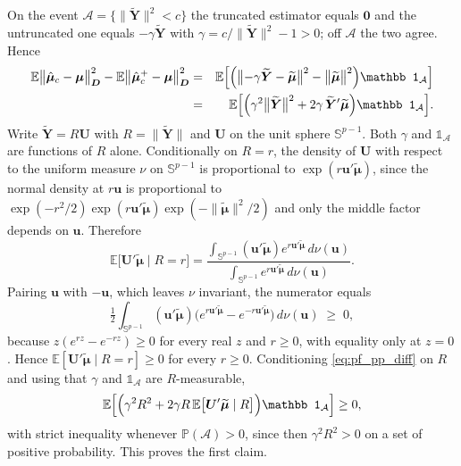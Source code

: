 \documentclass[pdflatex,sn-mathphys-num]{sn-jnl}%
\theoremstyle{thmstyleone}%
\theoremstyle{thmstyletwo}%
\theoremstyle{thmstylethree}%
\newcommand{\E}{\mathbb{E}}
\begin{document}
\begin{appendices}
On the event $\mathcal A=\{\|\widetilde{\bm Y}\|^2<c\}$ the truncated estimator equals $\bm 0$ and the untruncated one equals $-\gamma\widetilde{\bm Y}$ with $\gamma=c/\|\widetilde{\bm Y}\|^2-1>0$; off $\mathcal A$ the two agree. Hence
\begin{eqnarray}
\label{eq:pf_pp_diff}
\E\bigl\|\hat{\bm\mu}_c-\bm\mu\bigr\|^2_{\bm D}
-\E\bigl\|\hat{\bm\mu}^{+}_c-\bm\mu\bigr\|^2_{\bm D}
&=&
\E\Bigl[\Bigl(\bigl\|-\gamma\widetilde{\bm Y}-\widetilde{\bm\mu}\bigr\|^2-\bigl\|\widetilde{\bm\mu}\bigr\|^2\Bigr)\mathbb 1_{\mathcal A}\Bigr]
\cr
&=&
\E\Bigl[\Bigl(\gamma^{2}\bigl\|\widetilde{\bm Y}\bigr\|^{2}+2\gamma\,\widetilde{\bm Y}'\widetilde{\bm\mu}\Bigr)\mathbb 1_{\mathcal A}\Bigr].
\end{eqnarray}
Write $\widetilde{\bm Y}=R\bm U$ with $R=\|\widetilde{\bm Y}\|$ and $\bm U$ on the unit sphere $\mathbb S^{p-1}$. Both $\gamma$ and $\mathbb 1_{\mathcal A}$ are functions of $R$ alone. Conditionally on $R=r$, the density of $\bm U$ with respect to the uniform measure $\nu$ on $\mathbb S^{p-1}$ is proportional to $\exp(r\bm u'\widetilde{\bm\mu})$, since the normal density at $r\bm u$ is proportional to $\exp(-r^2/2)\exp(r\bm u'\widetilde{\bm\mu})\exp(-\|\widetilde{\bm\mu}\|^2/2)$ and only the middle factor depends on $\bm u$. Therefore
\begin{equation}
\E\bigl[\bm U'\widetilde{\bm\mu}\mid R=r\bigr]
=
\frac{\int_{\mathbb S^{p-1}}(\bm u'\widetilde{\bm\mu})e^{r\bm u'\widetilde{\bm\mu}}\,d\nu(\bm u)}
     {\int_{\mathbb S^{p-1}}e^{r\bm u'\widetilde{\bm\mu}}\,d\nu(\bm u)} .
\end{equation}
Pairing $\bm u$ with $-\bm u$, which leaves $\nu$ invariant, the numerator equals
\begin{equation}
\tfrac12\int_{\mathbb S^{p-1}}(\bm u'\widetilde{\bm\mu})\bigl(e^{r\bm u'\widetilde{\bm\mu}}-e^{-r\bm u'\widetilde{\bm\mu}}\bigr)\,d\nu(\bm u)
\;\ge\;0,
\end{equation}
because $z(e^{rz}-e^{-rz})\ge0$ for every real $z$ and $r\ge0$, with equality only at $z=0$. Hence $\E[\bm U'\widetilde{\bm\mu}\mid R=r]\ge0$ for every $r\ge0$. Conditioning \eqref{eq:pf_pp_diff} on $R$ and using that $\gamma$ and $\mathbb 1_{\mathcal A}$ are $R$-measurable,
\begin{equation}
\E\Bigl[\Bigl(\gamma^{2}R^{2}+2\gamma R\,\E\bigl[\bm U'\widetilde{\bm\mu}\mid R\bigr]\Bigr)\mathbb 1_{\mathcal A}\Bigr]\ge0 ,
\end{equation}
with strict inequality whenever $\mathbb P(\mathcal A)>0$, since then $\gamma^2R^2>0$ on a set of positive probability. This proves the first claim.


\end{appendices}
\end{document}
